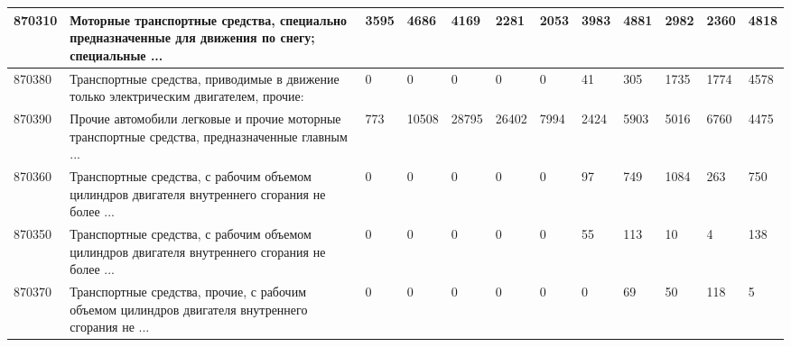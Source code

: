 {\begin{tabularx}{\textwidth}{|l|X|X|X|X|X|X|X|X|X|X|X|}
870310 & Моторные транспортные средства, специально предназначенные для движения по снегу; специальные ... & 3595 & 4686 & 4169 & 2281 & 2053 & 3983 & 4881 & 2982 & 2360 & 4818 \\ \hline
870380 & Транспортные средства, приводимые в движение только электрическим двигателем, прочие: & 0 & 0 & 0 & 0 & 0 & 41 & 305 & 1735 & 1774 & 4578 \\ \hline
870390 & Прочие автомобили легковые и прочие моторные транспортные средства, предназначенные главным ... & 773 & 10508 & 28795 & 26402 & 7994 & 2424 & 5903 & 5016 & 6760 & 4475 \\ \hline
870360 & Транспортные средства, с рабочим объемом цилиндров двигателя внутреннего сгорания не более ... & 0 & 0 & 0 & 0 & 0 & 97 & 749 & 1084 & 263 & 750 \\ \hline
870350 & Транспортные средства, с рабочим объемом цилиндров двигателя внутреннего сгорания не более ... & 0 & 0 & 0 & 0 & 0 & 55 & 113 & 10 & 4 & 138 \\ \hline
870370 & Транспортные средства, прочие, с рабочим объемом цилиндров двигателя внутреннего сгорания не ... & 0 & 0 & 0 & 0 & 0 & 0 & 69 & 50 & 118 & 5 \\ \hline
\end{tabularx}
}
